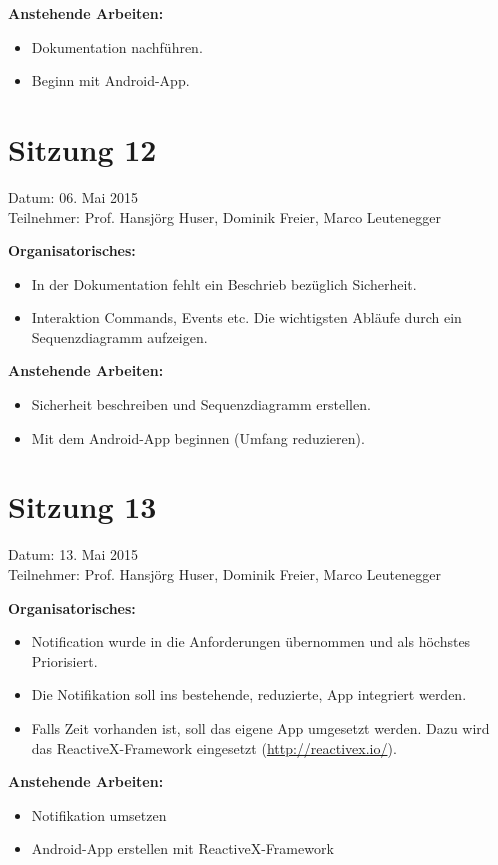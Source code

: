 	\textbf{Anstehende Arbeiten:}
	\begin{itemize}
		\item Dokumentation nachführen.
		\item Beginn mit Android-App.
	\end{itemize}

\section*{Sitzung 12}
	Datum: 06. Mai 2015 \\
	Teilnehmer: Prof. Hansjörg Huser, Dominik Freier, Marco Leutenegger

	\textbf{Organisatorisches:}
	\begin{itemize}
		\item In der Dokumentation fehlt ein Beschrieb bezüglich Sicherheit.
		\item Interaktion Commands, Events etc. Die wichtigsten Abläufe durch ein Sequenzdiagramm aufzeigen.
	\end{itemize}

	\textbf{Anstehende Arbeiten:}
	\begin{itemize}
		\item Sicherheit beschreiben und Sequenzdiagramm erstellen.
		\item Mit dem Android-App beginnen (Umfang reduzieren).
	\end{itemize}
	
\section*{Sitzung 13}
	Datum: 13. Mai 2015 \\
	Teilnehmer: Prof. Hansjörg Huser, Dominik Freier, Marco Leutenegger

	\textbf{Organisatorisches:}
	\begin{itemize}
		\item Notification wurde in die Anforderungen übernommen und als höchstes Priorisiert.
		\item Die Notifikation soll ins bestehende, reduzierte, App integriert werden.
		\item Falls Zeit vorhanden ist, soll das eigene App umgesetzt werden. Dazu wird das ReactiveX-Framework eingesetzt (\url{http://reactivex.io/}).
	\end{itemize}

	\textbf{Anstehende Arbeiten:}
	\begin{itemize}
		\item Notifikation umsetzen
		\item Android-App erstellen mit ReactiveX-Framework
	\end{itemize}

